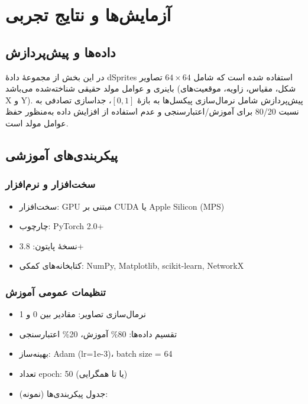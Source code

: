 \renewcommand{\chaptername}{بخش}
\chapter{آزمایش‌ها و نتایج تجربی}

\section{داده‌ها و پیش‌پردازش}
در این بخش از مجموعهٔ دادهٔ dSprites استفاده شده است که شامل $64\times64$ تصاویر باینری و عوامل مولد حقیقی شناخته‌شده می‌باشد (شکل، مقیاس، زاویه، موقعیت‌های X و Y). پیش‌پردازش شامل نرمال‌سازی پیکسل‌ها به بازهٔ $[0,1]$، جداسازی تصادفی به نسبت 80/20 برای آموزش/اعتبارسنجی و عدم استفاده از افزایش داده به‌منظور حفظ عوامل مولد است.

\section{پیکربندی‌های آموزشی}
\subsection{سخت‌افزار و نرم‌افزار}
\begin{itemize}
  \item سخت‌افزار: GPU مبتنی بر CUDA یا Apple Silicon (MPS)
  \item چارچوب: PyTorch 2.0+
  \item نسخهٔ پایتون: 3.8+
  \item کتابخانه‌های کمکی: NumPy, Matplotlib, scikit-learn, NetworkX
\end{itemize}

\subsection{تنظیمات عمومی آموزش}
\begin{itemize}
  \item نرمال‌سازی تصاویر: مقادیر بین 0 و 1
  \item تقسیم داده‌ها: 80\% آموزش، 20\% اعتبارسنجی
  \item بهینه‌ساز: Adam (lr=1e-3)، batch size = 64
  \item تعداد epoch: 50 (یا تا همگرایی)
  \item جدول پیکربندی‌ها (نمونه):
\end{itemize}

